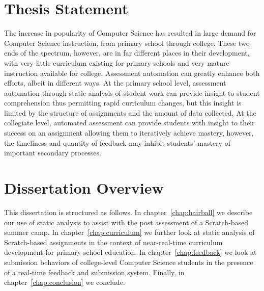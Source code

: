 \section{Thesis Statement}
The increase in popularity of Computer Science has resulted in large demand for
Computer Science instruction, from primary school through college. These two
ends of the spectrum, however, are in far different places in their
development, with very little curriculum existing for primary schools and very
mature instruction available for college. Assessment automation can greatly
enhance both efforts, albeit in different ways. At the primary school level,
assessment automation through static analysis of student work can provide
insight to student comprehension thus permitting rapid curriculum changes, but
this insight is limited by the structure of assignments and the amount of data
collected. At the collegiate level, automated assessment can provide students
with insight to their success on an assignment allowing them to iteratively
achieve mastery, however, the timeliness and quantity of feedback may inhibit
students' mastery of important secondary processes.

\section{Dissertation Overview}
This dissertation is structured as follows. In chapter~\ref{chap:hairball} we
describe our use of static analysis to assist with the post assessment of a
Scratch-based summer camp. In chapter~\ref{chap:curriculum} we further look at
static analysis of Scratch-based assignments in the context of near-real-time
curriculum development for primary school education. In
chapter~\ref{chap:feedback} we look at submission behaviors of college-level
Computer Science students in the presence of a real-time feedback and
submission system. Finally, in chapter~\ref{chap:conclusion} we conclude.
